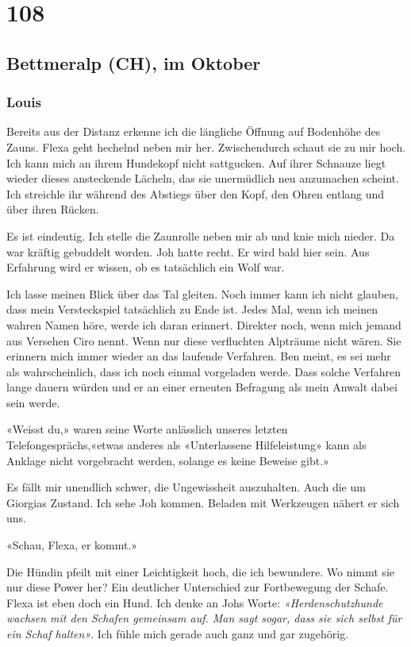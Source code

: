 \chapter{108}

\section{Bettmeralp (CH), im
Oktober}

\subsection{Louis}

Bereits aus der Distanz erkenne ich die längliche Öffnung auf Bodenhöhe des
Zauns.
Flexa geht hechelnd neben mir her. Zwischendurch schaut sie zu mir hoch.
Ich kann mich an ihrem Hundekopf nicht sattgucken. Auf ihrer Schnauze
liegt wieder dieses ansteckende Lächeln, das sie unermüdlich neu
anzumachen scheint. Ich streichle ihr während des Abstiegs über den
Kopf, den Ohren entlang und über ihren Rücken. 

Es ist eindeutig. Ich stelle die Zaunrolle neben mir ab und knie mich
nieder. Da war kräftig gebuddelt worden. Joh hatte recht. Er wird bald
hier sein. Aus Erfahrung wird er wissen, ob es tatsächlich ein Wolf war.

Ich lasse meinen Blick über das Tal gleiten. Noch immer kann ich nicht
glauben, dass mein Versteckspiel tatsächlich zu Ende ist. Jedes Mal,
wenn ich meinen wahren Namen höre, werde ich daran erinnert. Direkter
noch, wenn mich jemand aus Versehen Ciro nennt. Wenn nur diese verfluchten Alpträume nicht wären. 
Sie erinnern mich immer wieder an das laufende Verfahren. Ben meint, es sei mehr als wahrscheinlich, dass ich noch einmal vorgeladen werde. Dass solche Verfahren lange dauern würden und er an einer erneuten Befragung als mein Anwalt dabei sein werde.

«Weisst du,» waren seine Worte anlässlich unseres letzten Telefongesprächs,«etwas anderes als «Unterlassene 
Hilfeleistung» kann als Anklage nicht vorgebracht werden, solange es keine Beweise gibt.»

Es fällt mir unendlich schwer, die Ungewissheit auszuhalten. Auch die um Giorgias Zustand. 
Ich sehe Joh kommen. Beladen mit Werkzeugen nähert er sich uns.

«Schau, Flexa, er kommt.»

Die Hündin pfeilt mit einer Leichtigkeit hoch, die ich bewundere. Wo
nimmt sie nur diese Power her? Ein deutlicher Unterschied zur
Fortbewegung der Schafe. Flexa ist eben doch ein Hund. Ich denke an Johs
Worte: \emph{«Herdenschutzhunde wachsen mit den Schafen gemeinsam auf.
Man sagt sogar, dass sie sich selbst für ein Schaf halten»}. Ich
fühle mich gerade auch ganz und gar zugehörig.

